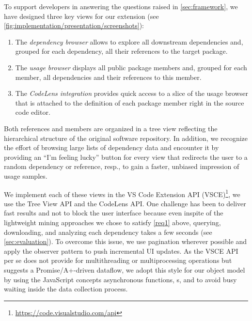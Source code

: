 To support developers in answering the questions raised in \cref{sec:framework}, we have designed three key views for our extension (see \cref{fig:implementation/presentation/screenshots}):

\begin{enumerate}[label=(\roman*)]
	\item The \emph{dependency browser} allows to explore all downstream dependencies and, grouped for each dependency, all their references to the target package.
	\item The \emph{usage browser} displays all public package members and, grouped for each member, all dependencies and their references to this member.
	\item The \emph{CodeLens integration} provides quick access to a slice of the usage browser that is attached to the definition of each package member right in the source code editor.
\end{enumerate}

Both references and members are organized in a tree view reflecting the hierarchical structure of the original software repository.
In addition, we recognize the effort of browsing large lists of dependency data and encounter it by providing an ``I'm feeling lucky'' button for every view that redirects the user to a random dependency or reference, resp., to gain a faster, unbiased impression of usage samples.

We implement each of these views in the VS Code Extension API (VSCE)\footnote{\url{https://code.visualstudio.com/api}}, we use the Tree View API and the CodeLens API.
One challenge has been to deliver fast results and not to block the user interface because even inspite of the lightweight mining approaches we chose to satisfy \cref{req1} above, querying, downloading, and analyzing each dependency takes a few seconds (see \cref{sec:evaluation}).
To overcome this issue, we use pagination wherever possible and apply the observer pattern to push incremental UI updates.
As the VSCE API per se does not provide for multithreading or multiprocessing operations but suggests a Promise/A+-driven dataflow, we adopt this style for our object model by using the JavaScript concepts asynchronous functions, s, and  to avoid busy waiting inside the data collection process.
